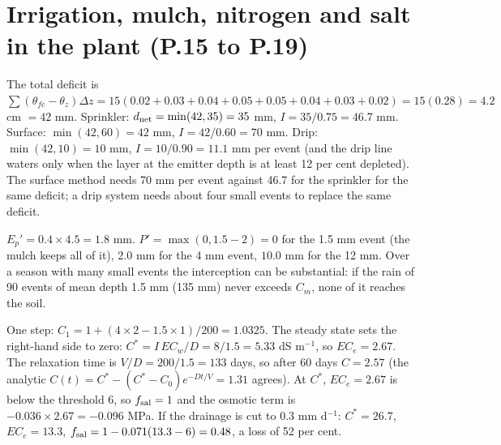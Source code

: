 \section{Irrigation, mulch, nitrogen and salt in the plant (P.15 to P.19)}
\sol  The total deficit is $\sum(\theta_{fc}-\theta_z)\Delta z=15(0.02+0.03+0.04+0.05+0.05+0.04+0.03+0.02)=15(0.28)=4.2$ cm $=42$ mm. Sprinkler: $d_{\rm net}=\min(42,35)=35$ mm, $I=35/0.75=46.7$ mm. Surface: $\min(42,60)=42$ mm, $I=42/0.60=70$ mm. Drip: $\min(42,10)=10$ mm, $I=10/0.90=11.1$ mm per event (and the drip line waters only when the layer at the emitter depth is at least 12 per cent depleted). The surface method needs 70 mm per event against 46.7 for the sprinkler for the same deficit; a drip system needs about four small events to replace the same deficit.


\sol  $E_p'=0.4\times4.5=1.8$ mm. $P'=\max(0,1.5-2)=0$ for the 1.5 mm event (the mulch keeps all of it), $2.0$ mm for the 4 mm event, $10.0$ mm for the 12 mm. Over a season with many small events the interception can be substantial: if the rain of 90 events of mean depth 1.5 mm (135 mm) never exceeds $C_m$, none of it reaches the soil.


\sol  One step: $C_1=1+(4\times2-1.5\times1)/200=1.0325$. The steady state sets the right-hand side to zero: $C^*=I\,EC_w/D=8/1.5=5.33$ dS m$^{-1}$, so $EC_e=2.67$. The relaxation time is $V/D=200/1.5=133$ days, so after 60 days $C=2.57$ (the analytic $C(t)=C^*-(C^*-C_0)e^{-Dt/V}=1.31$ agrees). At $C^*$, $EC_e=2.67$ is below the threshold 6, so $f_{\rm sal}=1$ and the osmotic term is $-0.036\times2.67=-0.096$ MPa. If the drainage is cut to $0.3$ mm d$^{-1}$: $C^*=26.7$, $EC_e=13.3$, $f_{\rm sal}=1-0.071(13.3-6)=0.48$, a loss of 52 per cent.

